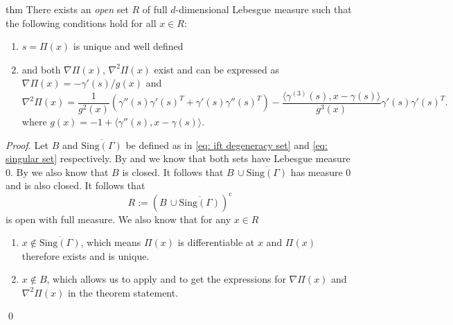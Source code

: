 \documentclass[11pt]{article}
\begin{document}
\begin{restatable}[Differentiability of $\Pi$]{thm}{} \label{thm: differentiability of pi}
    There exists an \textit{open} set $R$ of full $d$-dimensional Lebesgue measure such that the following conditions hold for all $x \in R$:
    \begin{enumerate}
        \item $s = \Pi(x)$ is unique and well defined
        \item and both $\nabla\Pi(x)$, $\nabla^2\Pi(x)$ exist and can be expressed as $\nabla\Pi(x)  = -\gamma'(s)/g(x)$ and 
        \begin{equation}
            \nabla^2\Pi(x) = \frac{1}{g^2(x)}\left(\gamma''(s)\gamma'(s)^T + \gamma'(s)\gamma''(s)^T\right)- \frac{\langle\gamma^{(3)}(s), x - \gamma(s)\rangle}{g^3(x)}\gamma'(s)\gamma'(s)^T.
        \end{equation}
        where $g(x) = -1 + \langle\gamma''(s), x-\gamma(s)\rangle$. 
    \end{enumerate}
\end{restatable}
\noindent \textit{Proof.} Let $B$ and $\overline{\text{Sing}(\Gamma)}$ be defined as in \cref{eq: ift degeneracy set} and \cref{eq: singular set} respectively. By  and  we know that both sets have Lebesgue measure $0$. By  we also know that $B$ is closed. It follows that $B \, \cup \overline{\text{Sing}(\Gamma)}$ has measure $0$ and is also closed. It follows that 
\begin{equation}
    R := \left(B \, \cup \overline{\text{Sing}(\Gamma)}\right)^c \label{eq: good set}
\end{equation}
is open with full measure. We also know that for any $x \in R$
\begin{enumerate}
    \item $x \notin \overline{\text{Sing}(\Gamma)}$, which means $\Pi(x)$ is differentiable at $x$ and $\Pi(x)$ therefore exists and is unique. 
    \item $x \notin B$, which allows us to apply  and  to get the expressions for $\nabla\Pi(x)$ and $\nabla^2\Pi(x)$ in the theorem statement.
\end{enumerate}
\qed{}

\end{document}
